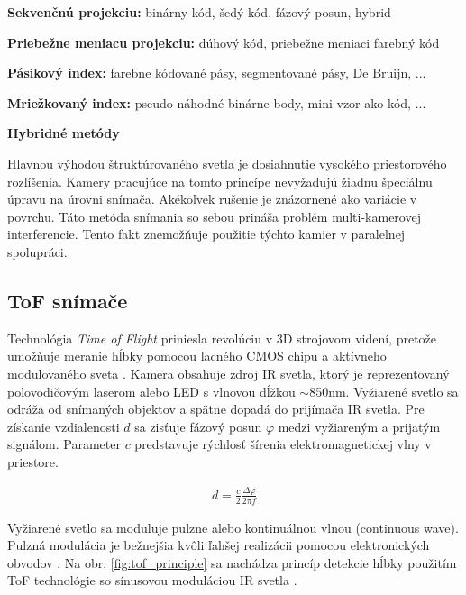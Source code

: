 \begin{compactitem}
	\item \textbf{Sekvenčnú projekciu:} binárny kód, šedý kód, fázový posun, hybrid 
	\item \textbf{Priebežne meniacu projekciu:} dúhový kód, priebežne meniaci farebný kód 
	\item \textbf{Pásikový index:} farebne kódované pásy, segmentované pásy, De Bruijn, ...
	\item \textbf{Mriežkovaný index:} pseudo-náhodné binárne body, mini-vzor ako kód, ...
	\item \textbf{Hybridné metódy} 
\end{compactitem}

Hlavnou výhodou štruktúrovaného svetla je dosiahnutie vysokého priestorového rozlíšenia. Kamery pracujúce na tomto princípe nevyžadujú žiadnu špeciálnu úpravu na úrovni snímača. Akékoľvek rušenie je znázornené ako variácie v povrchu. Táto metóda snímania so sebou prináša problém multi-kamerovej interferencie. Tento fakt znemožňuje použitie týchto kamier v paralelnej spolupráci.



\subsection{ToF snímače}
\label{sec:tof}

Technológia \textit{Time of Flight} priniesla revolúciu v 3D strojovom videní, pretože umožňuje meranie hĺbky pomocou lacného CMOS chipu a aktívneho modulovaného sveta \cite{li2014time}. Kamera obsahuje zdroj IR svetla, ktorý je reprezentovaný polovodičovým laserom alebo LED s vlnovou dĺžkou $\sim$850nm. Vyžiarené svetlo sa odráža od snímaných objektov a spätne dopadá do prijímača IR svetla. Pre získanie vzdialenosti $d$ sa zisťuje fázový posun $\varphi$ medzi vyžiareným a prijatým signálom. Parameter $c$ predstavuje rýchlosť šírenia elektromagnetickej vlny v priestore. 

\begin{equation}
\label{eq2}
\begin{aligned}
d=\frac{c}{2}\frac{\Delta \varphi}{2 \pi f}
\end{aligned}
\end{equation}

Vyžiarené svetlo sa moduluje pulzne alebo kontinuálnou vlnou (continuous wave). Pulzná modulácia je bežnejšia kvôli ľahšej realizácii pomocou elektronických obvodov \cite{hansard2012time}. Na obr. \ref{fig:tof_principle} sa nachádza princíp detekcie hĺbky použitím ToF technológie so sínusovou moduláciou IR svetla \cite{van2006time}.

